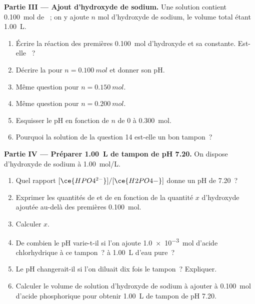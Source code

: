 \begin{problem}
\medskip
\noindent\textbf{Partie III --- Ajout d'hydroxyde de sodium.}
Une solution contient \qty{0.100}{mol} de ~; on y ajoute $n$
mol d'hydroxyde de sodium, le volume total étant \qty{1.00}{L}.
\begin{enumerate}[resume]
  \item Écrire la réaction des premières \qty{0.100}{mol} d'hydroxyde et
        sa constante. Est-elle ~?
  \item Décrire la  pour $n = \qty{0.100}{mol}$ et
        donner son pH.
  \item Même question pour $n = \qty{0.150}{mol}$.
  \item Même question pour $n = \qty{0.200}{mol}$.
  \item Esquisser le pH en fonction de $n$ de 0 à \qty{0.300}{mol}.
  \item Pourquoi la solution de la question 14 est-elle un bon tampon~?
\end{enumerate}

\medskip
\noindent\textbf{Partie IV --- Préparer \qty{1.00}{L} de tampon de pH 7.20.}
On dispose d'hydroxyde de sodium à \qty{1.00}{mol/L}.
\begin{enumerate}[resume]
  \item Quel rapport $[\ce{HPO4^{2-}}]/[\ce{H2PO4-}]$ donne un pH de 7.20~?
  \item Exprimer les quantités de  et de  en
        fonction de la quantité $x$ d'hydroxyde ajoutée au-delà des
        premières \qty{0.100}{mol}.
  \item Calculer $x$.
  \item De combien le pH varie-t-il si l'on ajoute \qty{1.0e-3}{mol}
        d'acide chlorhydrique à ce tampon~? à \qty{1.00}{L} d'eau pure~?
  \item Le pH changerait-il si l'on diluait dix fois le tampon~?
        Expliquer.
  \item Calculer le volume de solution d'hydroxyde de sodium à ajouter à
        \qty{0.100}{mol} d'acide phosphorique pour obtenir \qty{1.00}{L}
        de tampon de pH 7.20.
\end{enumerate}
\end{problem}

